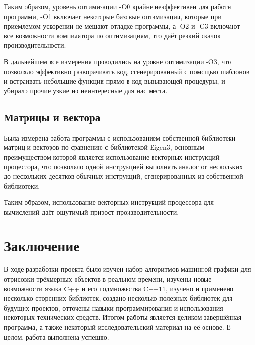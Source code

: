 \documentclass[a4paper,12pt]{report}
\numberwithin{equation}{section}
\begin{document}

Таким образом, уровень оптимизации -O0 крайне неэффективен для работы программи, -O1 включает некоторые базовые оптимизации, которые при приемлемом ускорении не мешают отладке программы, а -O2 и -O3 включают все возможности компилятора по оптимизациям, что даёт резкий скачок производительности.

В дальнейшем все измерения проводились на уровне оптимизации -O3, что позволяло эффективно разворачивать код, сгенерированный с помощью шаблонов и встраивать небольшие функции прямо в код вызывающей процедуры, и убирало прочие узкие но неинтересные для нас места.

\subsection{Матрицы и вектора}
Была измерена работа программы с использованием собственной библиотеки матриц и векторов по сравнению с библиотекой Eigen3, основным преимуществом которой является использование векторных инструкций процессора, что позволяло одной инструкцией выполнять аналог от нескольких до нескольких десятков обычных инструкций, сгенерированных из собственной библиотеки.


Таким образом, использование векторных инструкций процессора для вычислений даёт ощутимый прирост производительности.

\section*{Заключение}
В ходе разработки проекта было изучен набор алгоритмов машинной графики для отрисовки трёхмерных объектов в реальном времени, изучены новые возможности языка C++ и его подмножества C++11, изучено и применено несколько сторонних библиотек, создано несколько полезных библиотек для будущих проектов, отточены навыки программирования и использования некоторых технических средств. Итогом работы является целиком завершённая программа, а также некоторый исследовательский материал на её основе. В целом, работа выполнена успешно.
\end{document}
